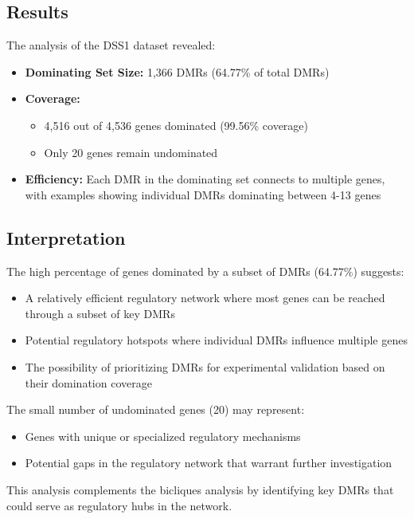 \documentclass{article}
\begin{document}
\subsection{Results}
The analysis of the DSS1 dataset revealed:
\begin{itemize}
    \item \textbf{Dominating Set Size:} 1,366 DMRs (64.77\% of total DMRs)
    \item \textbf{Coverage:}
    \begin{itemize}
        \item 4,516 out of 4,536 genes dominated (99.56\% coverage)
        \item Only 20 genes remain undominated
    \end{itemize}
    \item \textbf{Efficiency:} Each DMR in the dominating set connects to multiple genes, with examples showing individual DMRs dominating between 4-13 genes
\end{itemize}

\subsection{Interpretation}
The high percentage of genes dominated by a subset of DMRs (64.77\%) suggests:
\begin{itemize}
    \item A relatively efficient regulatory network where most genes can be reached through a subset of key DMRs
    \item Potential regulatory hotspots where individual DMRs influence multiple genes
    \item The possibility of prioritizing DMRs for experimental validation based on their domination coverage
\end{itemize}

The small number of undominated genes (20) may represent:
\begin{itemize}
    \item Genes with unique or specialized regulatory mechanisms
    \item Potential gaps in the regulatory network that warrant further investigation
\end{itemize}

This analysis complements the bicliques analysis by identifying key DMRs that could serve as regulatory hubs in the network.
\end{document}
